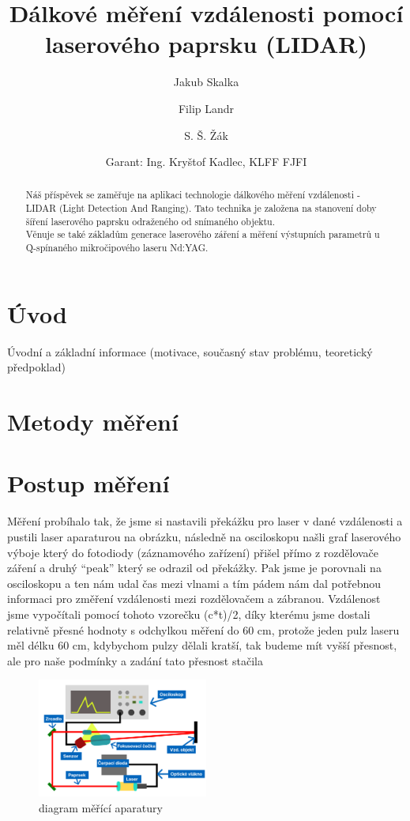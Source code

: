 \documentclass[12pt,a4paper]{article}
\title{Dálkové měření vzdálenosti pomocí laserového paprsku (LIDAR)}
\author[1]{Jakub Skalka}
\author[2]{Filip Landr}
\author[3]{S. Š. Žák }
\date{\small Garant: Ing. Kryštof Kadlec, KLFF FJFI\vspace{-2em}} %
\affil[1]{Gymnázium, České Budějovice, Jírovcova 8; skalkaj@jirovcovka.net}
\affil[2]{Gymnázium Nad Kavalírkou, Praha; fi.landr@seznam.cz}
\affil[3]{ Ten třetí človíček\vspace{-1em}} %
\begin{document}
\maketitle \thispagestyle{empty}

\begin{abstract} \noindent
    Náš příspěvek se zaměřuje na aplikaci technologie dálkového měření vzdálenosti - LIDAR (Light Detection And Ranging). Tato technika je založena na stanovení doby šíření laserového paprsku odraženého od snímaného objektu. \\Věnuje se také základům generace laserového záření a měření výstupních parametrů u Q-spínaného mikročipového laseru Nd:YAG.\end{abstract}


\section{Úvod}
Úvodní a základní informace (motivace, současný stav problému, teoretický předpoklad)

\pagebreak
\section{Metody měření}

\section{Postup měření}
Měření probíhalo tak, že jsme si nastavili překážku pro laser v dané vzdálenosti a pustili laser aparaturou na obrázku, následně na osciloskopu našli graf laserového výboje který do fotodiody (záznamového zařízení) přišel přímo z rozdělovače záření a druhý “peak” který se odrazil od překážky. Pak jsme je porovnali na osciloskopu a ten nám udal čas mezi vlnami a tím pádem nám dal potřebnou informaci pro změření vzdálenosti mezi rozdělovačem a zábranou. Vzdálenost jsme vypočítali pomocí tohoto vzorečku (c*t)/2, díky kterému jsme dostali relativně přesné hodnoty s odchylkou měření do 60 cm, protože jeden pulz laseru měl délku 60 cm, kdybychom pulzy dělali kratší, tak budeme mít vyšší přesnost, ale pro naše podmínky a zadání tato přesnost stačila

\begin{figure}[bh]
    \centering
    \includegraphics[width=0.5\textwidth]{Diagram měření.png}
    \caption{diagram měřící aparatury}
\end{figure}
\end{document}
